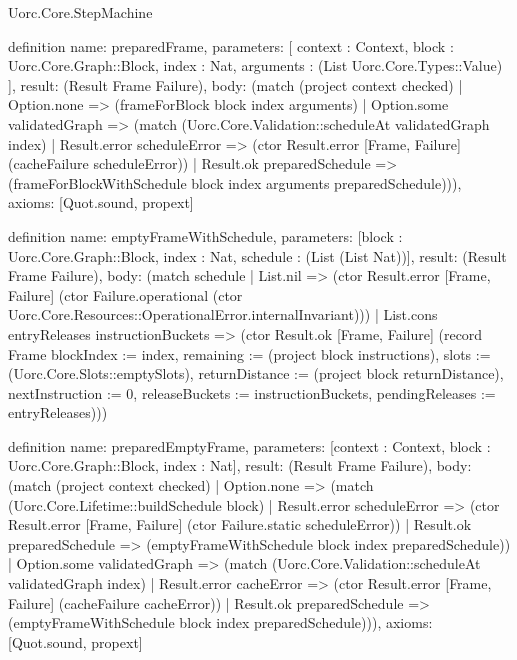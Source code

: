 \begin{lexlean}{Uorc.Core.StepMachine}
\begin{semanticmodule}
definition{
  name: preparedFrame,
  parameters: [
    context : Context,
    block : Uorc.Core.Graph::Block,
    index : Nat,
    arguments : (List Uorc.Core.Types::Value)
  ],
  result: (Result Frame Failure),
  body: (match (project context checked)
    | Option.none => (frameForBlock block index arguments)
    | Option.some validatedGraph => (match (Uorc.Core.Validation::scheduleAt validatedGraph index)
      | Result.error scheduleError => (ctor Result.error [Frame, Failure] (cacheFailure scheduleError))
      | Result.ok preparedSchedule => (frameForBlockWithSchedule block index arguments preparedSchedule))),
  axioms: [Quot.sound, propext]
}

definition{
  name: emptyFrameWithSchedule,
  parameters: [block : Uorc.Core.Graph::Block, index : Nat, schedule : (List (List Nat))],
  result: (Result Frame Failure),
  body: (match schedule
    | List.nil => (ctor Result.error [Frame, Failure] (ctor Failure.operational (ctor Uorc.Core.Resources::OperationalError.internalInvariant)))
    | List.cons entryReleases instructionBuckets => (ctor Result.ok [Frame, Failure] (record Frame {blockIndex := index, remaining := (project block instructions), slots := (Uorc.Core.Slots::emptySlots), returnDistance := (project block returnDistance), nextInstruction := 0, releaseBuckets := instructionBuckets, pendingReleases := entryReleases})))
}

definition{
  name: preparedEmptyFrame,
  parameters: [context : Context, block : Uorc.Core.Graph::Block, index : Nat],
  result: (Result Frame Failure),
  body: (match (project context checked)
    | Option.none => (match (Uorc.Core.Lifetime::buildSchedule block)
      | Result.error scheduleError => (ctor Result.error [Frame, Failure] (ctor Failure.static scheduleError))
      | Result.ok preparedSchedule => (emptyFrameWithSchedule block index preparedSchedule))
    | Option.some validatedGraph => (match (Uorc.Core.Validation::scheduleAt validatedGraph index)
      | Result.error cacheError => (ctor Result.error [Frame, Failure] (cacheFailure cacheError))
      | Result.ok preparedSchedule => (emptyFrameWithSchedule block index preparedSchedule))),
  axioms: [Quot.sound, propext]
}


\end{semanticmodule}
\end{lexlean}
